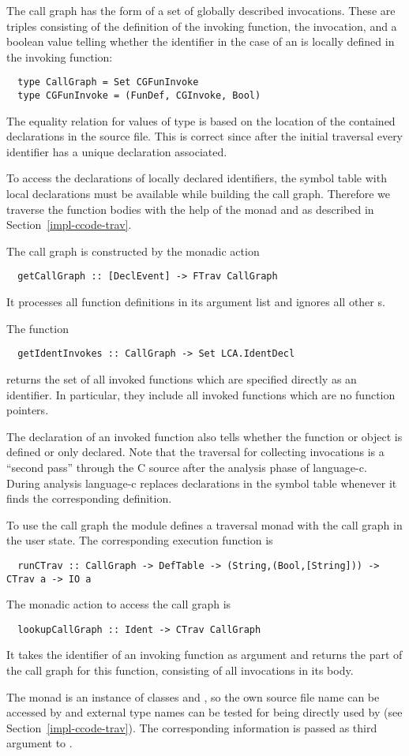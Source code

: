 The call graph has the form of a set of globally described invocations. These are triples consisting of the definition
of the invoking function, the invocation, and a boolean value telling whether the identifier in the case of an
 is locally defined in the invoking function:
\begin{verbatim}
  type CallGraph = Set CGFunInvoke
  type CGFunInvoke = (FunDef, CGInvoke, Bool)
\end{verbatim}
The equality relation for values of type  is based on the location of the contained declarations
in the source file. This is correct since after the initial traversal every identifier has a unique declaration associated.

To access the declarations of locally declared identifiers, the symbol table with local declarations
must be available while building the call graph. Therefore we traverse the function bodies with the help of
the  monad and  as described in Section~\ref{impl-ccode-trav}.

The call graph is constructed by the monadic action
\begin{verbatim}
  getCallGraph :: [DeclEvent] -> FTrav CallGraph
\end{verbatim}
It processes all function definitions in its argument list and ignores all other s.

The function 
\begin{verbatim}
  getIdentInvokes :: CallGraph -> Set LCA.IdentDecl
\end{verbatim}
returns the set of all invoked functions which are specified directly as an identifier. In particular, they include
all invoked functions which are no function pointers.

The declaration of an invoked function also tells 
whether the function or object is defined or only declared. Note that the traversal for collecting invocations is a ``second 
pass'' through the C source after the analysis phase of language-c. During analysis language-c replaces
declarations in the symbol table whenever it finds the corresponding definition.

To use the call graph the  module defines a traversal monad  
with the call graph in the user state. The corresponding execution function is
\begin{verbatim}
  runCTrav :: CallGraph -> DefTable -> (String,(Bool,[String])) -> CTrav a -> IO a
\end{verbatim}
The monadic action to access the call graph is
\begin{verbatim}
  lookupCallGraph :: Ident -> CTrav CallGraph
\end{verbatim}
It takes the identifier of an invoking function as argument and returns the part of the call graph for this function,
consisting of all invocations in its body.

The monad  is an instance of classes  and , so the own source file 
name can be accessed by  and external type names can be tested for being directly used by 
 (see Section~\ref{impl-ccode-trav}). The corresponding information is passed as third argument
to .

